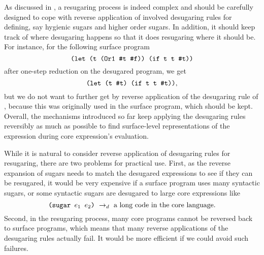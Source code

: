 As discussed in \cite{resugaring,hygienic}, a resugaring process is indeed complex and should be carefully designed to cope with reverse application of involved desugaring rules for defining, say hygienic sugars and higher order sugars. In addition, it should keep track of where desugaring happens so that it does resugaring where it should be. For instance, for the following surface program
\[
\texttt{(let (t (Or1 \#t \#f)) (if t t \#t))}
\]
after one-step reduction on the desugared program, we get
\[
\texttt{(let (t \#t) (if t t \#t))},
\]
but we do not want to further get  by reverse application of the desugaring rule of , because this  was originally used in the surface program, which should be kept.
Overall, the mechanisms introduced so far keep applying the desugaring rules reversibly as much as possible to find surface-level representations of the expression during core expression's evaluation.

While it is natural to consider reverse application of desugaring rules for resugaring, there are two problems for practical use. First, as the reverse expansion of sugars needs to match the desugared expressions to see if they can be resugared, it would be very expensive if a surface program uses many syntactic sugars, or some syntactic sugars are desugared to large core expressions like
\[
\texttt{(sugar $e_1$ $e_2$)} ~\rightarrow_d~ \mbox{a long code in the core language}.
\]
Second, in the resugaring process, many core programs cannot be reversed  back to surface programs, which means that many reverse applications of the desugaring rules actually fail. It would be more efficient if we could avoid such failures.




